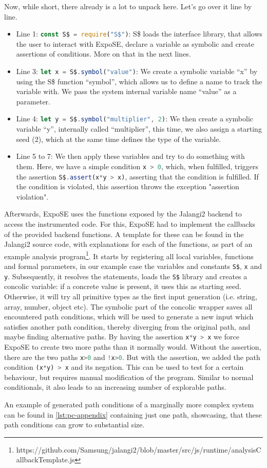 Now, while short, there already is a lot to unpack here. Let's go over it line by line. 
\begin{itemize}
    \item Line 1: \lstinline[language=JavaScript]{const S$ = require("S$")}: S\$ loads the interface library, that allows the user to interact with ExpoSE, declare a variable as symbolic and create assertions of conditions. More on that in the next lines.
    \item Line 3: \lstinline[language=JavaScript]{let x = S$.symbol("value")}: We create a symbolic variable “x” by using the S\$ function “symbol”, which allows us to define a name to track the variable with. We pass the system internal variable name “value” as a parameter.  
    \item Line 4: \lstinline[language=JavaScript]{let y = S$.symbol("multiplier", 2)}: We then create a symbolic variable “y”, internally called “multiplier”, this time, we also assign a starting seed (2), which at the same time defines the type of the variable.
    \item Line 5 to 7: We then apply these variables and try to do something with them. Here, we have a simple condition \lstinline[language=JavaScript]+x > 0+, which, when fulfilled, triggers the assertion \lstinline[language=JavaScript]{S$.assert(x*y > x)}, asserting that the condition is fulfilled. If the condition is violated, this assertion throws the exception "assertion violation". 
\end{itemize}
Afterwards, ExpoSE uses the functions exposed by the Jalangi2 backend  to access the instrumented code. For this, ExpoSE had to implement the callbacks of the provided backend functions. A template for these can be found in the Jalangi2 source code, with explanations for each of the functions, as part of an example analysis program\footnote{https://github.com/Samsung/jalangi2/blob/master/src/js/runtime/analysisCallbackTemplate.js}. 
It starts by registering all local variables, functions and formal parameters, in our example case the variables and constants \lstinline[language=JavaScript]{S$}, \lstinline[language=JavaScript]{x} and \lstinline[language=JavaScript]{y}. Subsequently, it resolves the statements, loads the \lstinline[language=JavaScript]{S$} library and creates a concolic variable: if a concrete value is present, it uses this as starting seed. Otherwise, it will try all primitive types as the first input generation (i.e. string, array, number, object etc). The symbolic part of the concolic wrapper saves all encountered path conditions, which will be used to generate a new input which satisfies another path condition, thereby diverging from the original path, and maybe finding alternative paths.
By having the assertion \lstinline[language=JavaScript]{x*y > x} we force ExpoSE to create two more paths than it normally would. Without the assertion, there are the two paths \lstinline[language=JavaScript]{x>0} and \lstinline[language=JavaScript]{!x>0}. But with the assertion, we added the path condition \lstinline[language=JavaScript]{(x*y) > x} and its negation. This can be used to test for a certain behaviour, but requires manual modification of the program. Similar to normal conditionals, it also leads to an increasing number of explorable paths.

An example of generated path conditions of a marginally more complex system can be found in \autoref{lst:pc-appendix} containing just one path, showcasing, that these path conditions can grow to substantial size.


